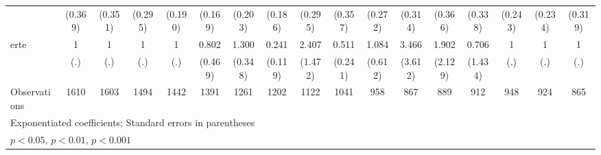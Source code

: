 {\begin{tabular}{l*{16}{c}}
                    &     (0.369)         &     (0.351)         &     (0.295)         &     (0.190)         &     (0.169)         &     (0.203)         &     (0.186)         &     (0.295)         &     (0.357)         &     (0.272)         &     (0.314)         &     (0.366)         &     (0.338)         &     (0.243)         &     (0.234)         &     (0.319)         \\
[1em]
erte                &           1         &           1         &           1         &           1         &       0.802         &       1.300         &       0.241\sym{**} &       2.407         &       0.511         &       1.084         &       3.466         &       1.902         &       0.706         &           1         &           1         &           1         \\
                    &         (.)         &         (.)         &         (.)         &         (.)         &     (0.469)         &     (0.348)         &     (0.119)         &     (1.472)         &     (0.241)         &     (0.612)         &     (3.612)         &     (2.129)         &     (1.434)         &         (.)         &         (.)         &         (.)         \\
\hline
Observations        &        1610         &        1603         &        1494         &        1442         &        1391         &        1261         &        1202         &        1122         &        1041         &         958         &         867         &         889         &         912         &         948         &         924         &         865         \\
\hline\hline
\multicolumn{17}{l}{\footnotesize Exponentiated coefficients; Standard errors in parentheses}\\
\multicolumn{17}{l}{\footnotesize \sym{*} \(p<0.05\), \sym{**} \(p<0.01\), \sym{***} \(p<0.001\)}\\
\end{tabular}
}
